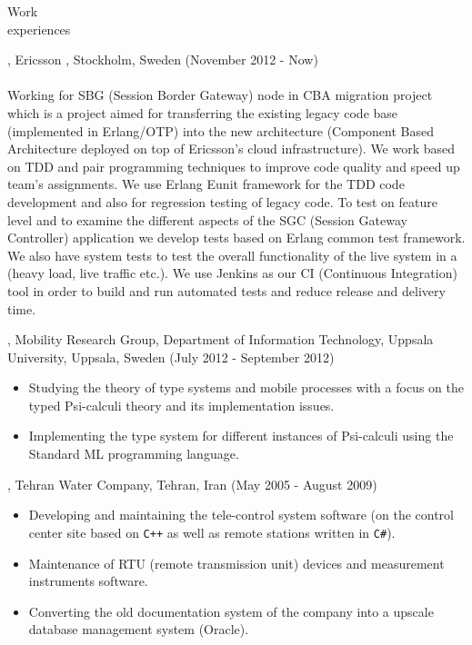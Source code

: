 \documentclass{resume}
\begin{document}

\begin{category}{Work \\experiences}

, Ericsson , Stockholm, Sweden (November 2012 - Now)\\ \\
Working for SBG (Session Border Gateway) node in CBA migration project which is a project 
aimed for transferring the existing legacy code base (implemented in Erlang/OTP) into the 
new architecture (Component Based Architecture deployed on top of Ericsson's cloud infrastructure). 
We work based on TDD and pair programming techniques to improve code quality and
speed up team's assignments. We use Erlang Eunit framework for the TDD code development and also
for regression testing of legacy code.
To test on feature level and to examine the different aspects of the SGC (Session Gateway Controller) 
application we develop tests based on Erlang common test framework. We 
also have system tests to test the overall functionality of the live system in a (heavy load, live traffic etc.). 
We use Jenkins as our CI (Continuous Integration) tool in order to build and run automated tests and  
reduce release and delivery time. 

, Mobility Research Group, Department of Information Technology, 
Uppsala University, Uppsala, Sweden (July 2012 - September 2012)\\ 
\begin{itemize}
 \item Studying the theory of type systems and mobile processes with a 
  focus on the typed Psi-calculi theory and its implementation issues.
 \item Implementing the type system for different instances of Psi-calculi 
  using the Standard ML programming language.
\end{itemize}

, Tehran Water Company, Tehran, Iran (May 2005 - August 2009)\\ 
\begin{itemize}
 \item Developing and maintaining the tele-control system software (on the control center site based 
  on \texttt{C++} as well as remote stations written in \texttt{C\#}).
 \item Maintenance of RTU (remote transmission unit) devices and measurement instruments software.
 \item Converting the old documentation system of the company into a upscale 
  database management system (Oracle).
\end{itemize}


\end{category}
\end{document}
